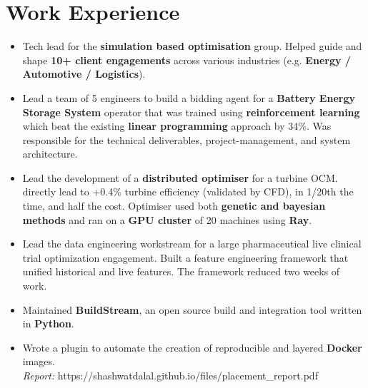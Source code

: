 \documentclass[a4paper]{deedy-resume} %
\begin{document}
\section{Work Experience}
\begin{itemize}
    \item Tech lead for the \textbf{simulation based optimisation} group. Helped guide and shape \textbf{10+ client engagements} across various industries (e.g. \textbf{Energy / Automotive / Logistics}). 
    \item Lead a team of 5 engineers to build a bidding agent for a \textbf{Battery Energy Storage System} operator that was trained using \textbf{reinforcement learning} which beat the existing \textbf{linear programming} approach by 34\%. Was responsible for the technical deliverables, project-management, and system architecture.
    \item Lead the development of a \textbf{distributed optimiser} for a turbine OCM. directly lead to +0.4\% turbine efficiency (validated by CFD), in 1/20th the time, and half the cost. Optimiser used both \textbf{genetic and bayesian methods} and ran on a \textbf{GPU cluster} of 20 machines using \textbf{Ray}. 
    \item Lead the data engineering workstream for a large pharmaceutical live clinical trial optimization engagement. Built a feature engineering framework that unified historical and live features. The framework reduced two weeks of work.
\end{itemize} 
\begin{itemize}
    \item Maintained \textbf{BuildStream}, an open source build and integration tool written in \textbf{Python}.
    \item Wrote a plugin to automate the creation of reproducible and layered \textbf{Docker} images.
    \\
    \textit{Report:} https://shashwatdalal.github.io/files/placement\_report.pdf \\
\end{itemize}
\end{document}
